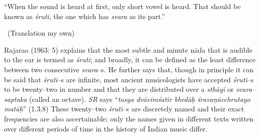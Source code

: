 \begin{myquote}
“When the sound is heard at first, only short vowel is heard. That should be known as \textit{śruti}, the one which has \textit{svara} as its part.” 

~\hfill (Translation my own)
\end{myquote}

Rajarao (1963: 5) explains that the most subtle and minute nāda that is audible to the ear is termed as \textit{śruti}; and broadly, it can be defined as the least difference between two consecutive \textit{svara}–s. He further says that, though in principle it can be said that \textit{śruti}–s are infinite, most ancient musicologists have accepted \textit{śruti}–s to be twenty–two in number and that they are distributed over a \textit{sthāyi} or \textit{svara–saptaka} (called an octave). \textit{SR} says “\textit{tasya dvāvimśatir bhedāḥ śravaṇācchrutayo matāḥ}” (1.3.8) These twenty–two \textit{śruti}–s are discretely named and their exact frequencies are also ascertainable; only the names given in different texts written over different periods of time in the history of Indian music differ.

